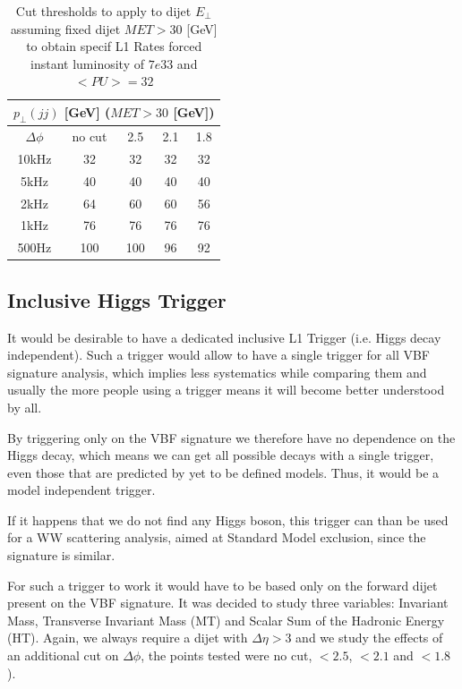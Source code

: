 \documentclass[%
 reprint,
 amsmath,
 amssymb,
 aps,
 pra,
 showkeys
]{revtex4-1}
\begin{document}
\begin{table} 
\begin{tabular}{|c||c|c|c|c|}
\hline
\multicolumn{5}{|c|}{$p_\bot(jj)$ [GeV] ($MET>30$ [GeV])} \\
\hline
$\Delta\phi$ & no cut & 2.5 & 2.1 & 1.8 \\
\hline
10kHz        &     32 &  32 &  32 &  32 \\
5kHz         &     40 &  40 &  40 &  40 \\
2kHz         &     64 &  60 &  60 &  56 \\
1kHz         &     76 &  76 &  76 &  76 \\
500Hz        &    100 & 100 &  96 &  92 \\
\hline
\end{tabular}
\caption{Cut thresholds to apply to dijet $E_\bot$ assuming fixed dijet $MET>30$ [GeV] to obtain specif L1 Rates forced
instant luminosity of $7e33$ and $<PU>=32$}
\label{table_7E33_PU32_fixedMET}
\end{table}

\subsection{Inclusive Higgs Trigger}

It would be desirable to have a dedicated inclusive L1 Trigger (i.e. Higgs decay independent). Such a trigger
would allow to have a single trigger for all VBF signature analysis, which implies less systematics 
while comparing them and usually the more people using a trigger means it will become better understood by all.
 
By triggering only on the VBF signature we therefore have no dependence on the Higgs decay, which means
we can get all possible decays with a single trigger, even those that are predicted by yet to be defined models.
Thus, it would be a model independent trigger.

If it happens that we do not find any Higgs boson, this trigger can than be used for a WW scattering analysis, aimed 
at Standard Model exclusion, since the signature is similar.

For such a trigger to work it would have to be based only on the forward dijet present on the VBF signature. 
It was decided to study three variables: Invariant Mass, Transverse Invariant Mass (MT) and Scalar Sum of the 
Hadronic Energy (HT). Again, we always require a dijet with $\Delta\eta>3$ and we study the effects of an additional cut
on $\Delta\phi$, the points tested were no cut, $<2.5$, $<2.1$ and $<1.8$).
  
\end{document}
